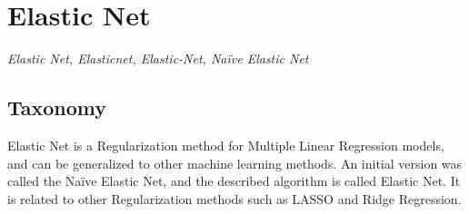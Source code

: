 

\section{Elastic Net} 
\label{sec:elasticnet}

\emph{Elastic Net, Elasticnet, Elastic-Net, Na\"ive Elastic Net}

\subsection{Taxonomy}
Elastic Net is a Regularization method for Multiple Linear Regression models, and can be generalized to other machine learning methods.
An initial version was called the  Na\"ive Elastic Net, and the described algorithm is called Elastic Net.
It is related to other Regularization methods such as LASSO and Ridge Regression.

